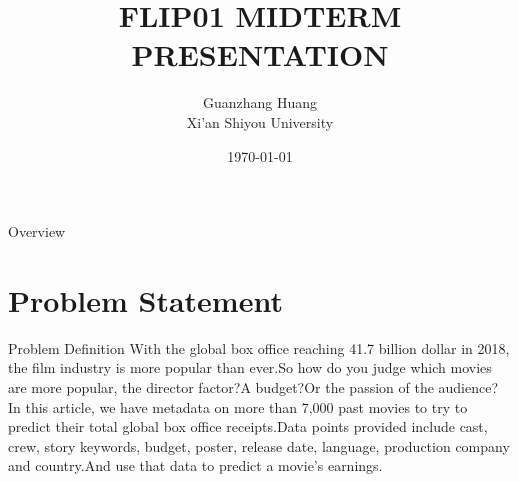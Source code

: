 \documentclass[
 size=12pt,
 paper=smartboard, %
 mode=present, %
 display=slides, %
style=tuliplab,
pauseslide,
fleqn,leqno]{powerdot}
\title{FLIP01 MIDTERM PRESENTATION}
\author{
Guanzhang Huang
\\
Xi'an Shiyou University 
}
\date{\today}
\begin{document}
\maketitle 
\begin{slide}[toc=,bm=]{Overview}
  \tableofcontents[content=sections]
\end{slide}

  \section{Problem Statement}

  \begin{slide}{Problem Definition}
 \hspace{0.5cm}  
 With the global box office reaching 41.7 billion dollar in 2018, the film industry is more popular than ever.So how do you judge which movies are more popular, the director factor?A budget?Or the passion of the audience?
 In this article, we have metadata on more than 7,000 past movies to try to predict their total global box office receipts.Data points provided include cast, crew, story keywords, budget, poster, release date, language, production company and country.And use that data to predict a movie's earnings.
  \end{slide}
\end{document}
